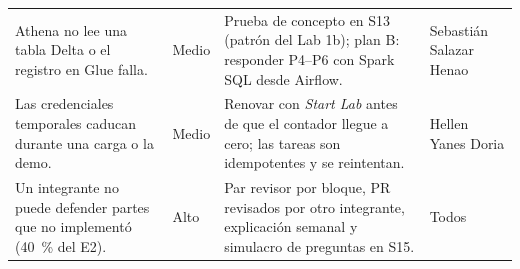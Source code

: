 \documentclass[12pt,letterpaper]{article}
\begin{document}
\begin{footnotesize}
\begin{longtable}{@{}P{1.95in}P{0.5in}P{2.85in}P{1.05in}@{}}
Athena no lee una tabla Delta o el registro en Glue falla. & Medio & Prueba de concepto en S13 (patrón del Lab 1b); plan B: responder P4--P6 con Spark SQL desde Airflow. & Sebastián Salazar Henao\\[1pt]
Las credenciales temporales caducan durante una carga o la demo. & Medio & Renovar con \emph{Start Lab} antes de que el contador llegue a cero; las tareas son idempotentes y se reintentan. & Hellen Yanes Doria\\[1pt]
Un integrante no puede defender partes que no implementó (40~\% del E2). & Alto & Par revisor por bloque, PR revisados por otro integrante, explicación semanal y simulacro de preguntas en S15. & Todos\\
\end{longtable}
\end{footnotesize}

\clearpage
\end{document}
